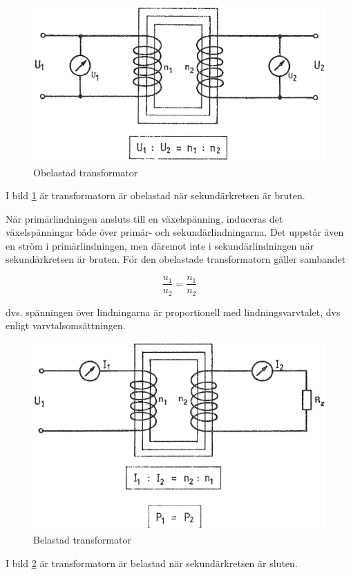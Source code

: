 \begin{figure}[ht]
\begin{center}
\includegraphics[width=.7\textwidth]{images/cropped_pdfs/bild_2_2-06.pdf}
\caption{Obelastad transformator}
\label{fig:BildII2-6}
\end{center}
\end{figure}

I bild \ref{fig:BildII2-6} är transformatorn är obelastad när sekundärkretsen
är bruten.

När primärlindningen ansluts till en växelspänning, induceras det
växelspänningar både över primär- och sekundärlindningarna. Det uppstår även en
ström i primärlindningen, men däremot inte i sekundärlindningen när
sekundärkretsen är bruten. För den obelastade transformatorn gäller sambandet

\[ \frac{u_1}{u_2} = \frac{n_1}{n_2} \]

dvs. spänningen över lindningarna är proportionell med lindningsvarvtalet,
dvs enligt varvtalsomsättningen.

\begin{figure}[ht]
\begin{center}
\includegraphics[width=.7\textwidth]{images/cropped_pdfs/bild_2_2-07.pdf}
\caption{Belastad transformator}
\label{fig:BildII2-7}
\end{center}
\end{figure}

I bild \ref{fig:BildII2-7} är transformatorn är belastad när sekundärkretsen
är sluten.

